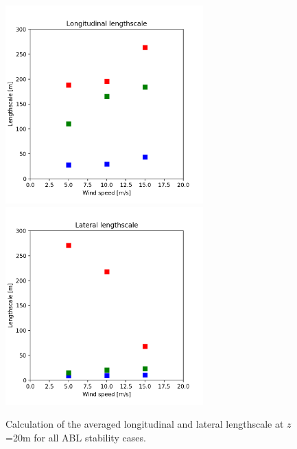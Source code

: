 \begin{figure}[hbt!]
  \label{fig:AllStabilityLengthscale}
  \centering
  \includegraphics[width=3in]{figures/AllStability_Rij_LongitudinalLengthscale.png}
  \includegraphics[width=3in]{figures/AllStability_Rij_LateralLengthscale.png}
  \caption{Calculation of the averaged longitudinal and lateral
    lengthscale at $z$=20m for all ABL stability cases.}
\end{figure}

